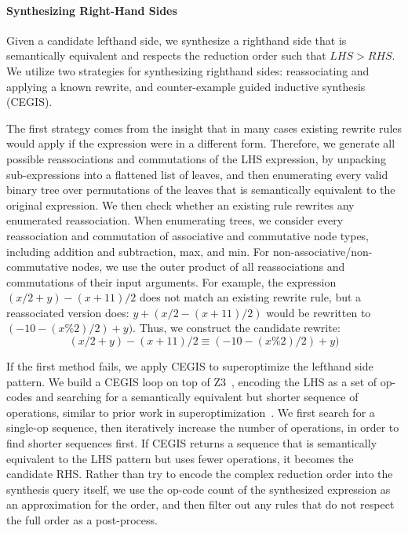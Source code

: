 \documentclass[sigplan,10pt,review,anonymous]{acmart}\settopmatter{printfolios=true,printccs=false,printacmref=false}
\begin{document}
\paragraph{Synthesizing Right-Hand Sides} Given a candidate lefthand side, we 
synthesize a righthand side that is semantically equivalent and respects the reduction
order such that $\mathit{LHS} > \mathit{RHS}$.  We utilize two strategies for synthesizing
righthand sides: reassociating and applying a known rewrite, and counter-example guided
inductive synthesis (CEGIS).

The first strategy comes from the insight that in many cases existing rewrite rules would apply
if the expression were in a different form.  Therefore, we generate all possible
reassociations and commutations of the LHS expression, by unpacking sub-expressions
into a flattened list of leaves, and then enumerating every valid binary
tree over permutations of the leaves that is semantically equivalent to the original
expression.  We then check whether an existing rule rewrites any enumerated reassociation.
When enumerating trees, we consider every reassociation and commutation
of associative and commutative node types, including addition and subtraction, max, and
min.  For non-associative/non-commutative nodes, we use the outer product of all reassociations
and commutations of their input arguments.  For example, the expression $(x/2 + y) - (x + 11)/2$
does not match an existing rewrite rule, but a reassociated version does: $y + (x/2 - (x + 11)/2)$
would be rewritten to $(-10 - (x \% 2)/2) + y)$.  Thus, we construct the candidate rewrite:
$$(x/2 + y) - (x + 11)/2 \equiv (-10 - (x \% 2)/2) + y)$$

If the first method fails, we apply CEGIS to superoptimize the lefthand side pattern.
We build a CEGIS loop on top of Z3~\cite{de2008z3}, encoding the LHS as a set of op-codes
and searching for a semantically equivalent but shorter sequence of operations, similar
to prior work in superoptimization~\cite{regehr2018superoptimization, mangpo2016superoptimization}.
We first search for a single-op sequence,
then iteratively increase the number of operations, in order to find shorter sequences
first.  If CEGIS returns a sequence that is semantically equivalent to the LHS pattern but uses fewer
operations, it becomes the candidate RHS. Rather than try to encode the complex reduction order into the synthesis query itself, we use the op-code count of the synthesized expression as an approximation for the order, and then filter out any rules that do not respect the full order as a post-process. 
\end{document}

